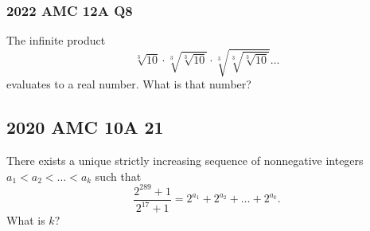 \documentclass{article}
\begin{document}
\vspace{100px}

\subsubsection{2022 AMC 12A Q8}
The infinite product\[\sqrt[3]{10} \cdot \sqrt[3]{\sqrt[3]{10}} \cdot \sqrt[3]{\sqrt[3]{\sqrt[3]{10}}} \ldots\]evaluates to a real number. What is that number?

\pagebreak

\subsection{2020 AMC 10A 21}

There exists a unique strictly increasing sequence of nonnegative integers $a_1 < a_2 < … < a_k$ such that\[\frac{2^{289}+1}{2^{17}+1} = 2^{a_1} + 2^{a_2} + … + 2^{a_k}.\]What is $k?$
\end{document}
